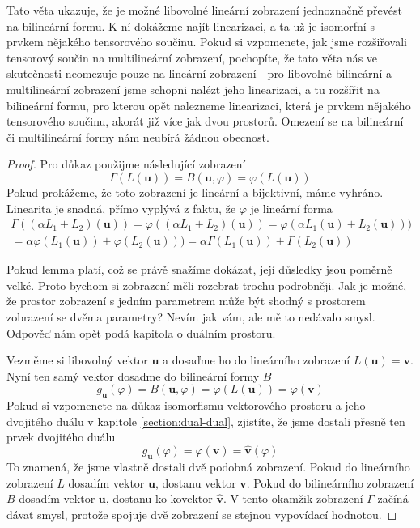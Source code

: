 \documentclass[a5paper,12pt]{amsbook}
\theoremstyle{definition}
\newcommand{\myvec}[1]{\bm{#1}}
\newcommand{\mycocovec}[1]{\mathbf{\widehat{#1}}}
\begin{document}
Tato věta ukazuje, že je možné libovolné lineární zobrazení jednoznačně převést na bilineární formu.
K ní dokážeme najít linearizaci, a ta už je isomorfní s prvkem nějakého tensorového součinu. Pokud
si vzpomenete, jak jsme rozšiřovali tensorový součin na multilineární zobrazení, pochopíte, že
tato věta nás ve skutečnosti neomezuje pouze na lineární zobrazení - pro libovolné bilineární a
multilineární zobrazení jsme schopni nalézt jeho linearizaci, a tu rozšířit na bilineární formu,
pro kterou opět nalezneme linearizaci, která je prvkem nějakého tensorového součinu, akorát již
více jak dvou prostorů. Omezení se na bilineární či multilineární formy nám neubírá žádnou obecnost.

\begin{proof}
Pro důkaz použijme následující zobrazení
\begin{equation*}
\Gamma(L(\myvec{u})) = B(\myvec{u}, \varphi) = \varphi(L(\myvec{u}))
\end{equation*}
Pokud prokážeme, že toto zobrazení je lineární a bijektivní, máme vyhráno.
Linearita je snadná, přímo vyplývá z faktu, že $\varphi$ je lineární forma
\begin{equation*}
\begin{split}
\Gamma((\alpha L_1 + L_2)(\myvec{u})) = \varphi((\alpha L_1 + L_2)(\myvec{u}))
  = \varphi(\alpha L_1(\myvec{u}) + L_2(\myvec{u}))) \\
  = \alpha\varphi(L_1(\myvec{u})) + \varphi(L_2(\myvec{u})))
  = \alpha\Gamma(L_1(\myvec{u})) + \Gamma(L_2(\myvec{u}))
\end{split}
\end{equation*}

Pokud lemma platí, což se právě snažíme dokázat, její důsledky jsou poměrně velké. Proto bychom
si zobrazení měli rozebrat trochu podrobněji. Jak je možné, že prostor zobrazení s jedním
parametrem může být shodný s prostorem zobrazení se dvěma parametry? Nevím jak vám, ale mě
to nedávalo smysl. Odpověď nám opět podá kapitola o duálním prostoru.

Vezměme si libovolný vektor $\myvec{u}$ a dosaďme ho do lineárního zobrazení $L(\myvec{u}) = \myvec{v}$.
Nyní ten samý vektor dosaďme do bilineární formy $B$
\begin{equation*}
g_{\myvec{u}}(\varphi) = B(\myvec{u}, \varphi) = \varphi(L(\myvec{u})) = \varphi(\myvec{v})
\end{equation*}
Pokud si vzpomenete na důkaz isomorfismu vektorového prostoru a jeho dvojitého duálu v kapitole
\ref{section:dual-dual}, zjistíte, že jsme dostali přesně ten prvek dvojitého duálu
\begin{equation*}
g_{\myvec{u}}(\varphi) = \varphi(\myvec{v}) = \mycocovec{v}(\varphi)
\end{equation*}
To znamená, že jsme vlastně dostali dvě podobná zobrazení. Pokud do lineárního zobrazení
$L$ dosadím vektor $\myvec{u}$, dostanu vektor $\myvec{v}$. Pokud do bilineárního zobrazení
$B$ dosadím vektor $\myvec{u}$, dostanu ko-kovektor $\mycocovec{v}$. V tento okamžik zobrazení
$\Gamma$ začíná dávat smysl, protože spojuje dvě zobrazení se stejnou vypovídací hodnotou.


\end{proof}
\end{document}
